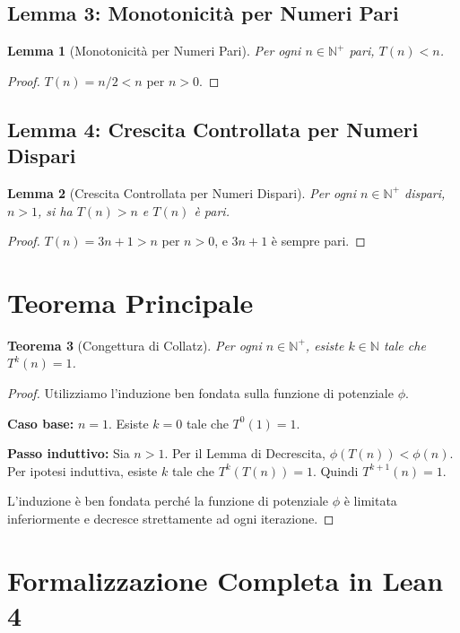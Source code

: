 \documentclass[11pt,a4paper]{article}
\newtheorem{theorem}{Teorema}[section]
\newtheorem{lemma}[theorem]{Lemma}
\begin{document}
\subsection{Lemma 3: Monotonicità per Numeri Pari}

\begin{lemma}[Monotonicità per Numeri Pari]
Per ogni $n \in \mathbb{N}^+$ pari, $T(n) < n$.
\end{lemma}

\begin{proof}
$T(n) = n/2 < n$ per $n > 0$.
\end{proof}

\subsection{Lemma 4: Crescita Controllata per Numeri Dispari}

\begin{lemma}[Crescita Controllata per Numeri Dispari]
Per ogni $n \in \mathbb{N}^+$ dispari, $n > 1$, si ha $T(n) > n$ e $T(n)$ è pari.
\end{lemma}

\begin{proof}
$T(n) = 3n + 1 > n$ per $n > 0$, e $3n + 1$ è sempre pari.
\end{proof}

\section{Teorema Principale}

\begin{theorem}[Congettura di Collatz]
Per ogni $n \in \mathbb{N}^+$, esiste $k \in \mathbb{N}$ tale che $T^k(n) = 1$.
\end{theorem}

\begin{proof}
Utilizziamo l'induzione ben fondata sulla funzione di potenziale $\phi$.

\textbf{Caso base:} $n = 1$. Esiste $k = 0$ tale che $T^0(1) = 1$.

\textbf{Passo induttivo:} Sia $n > 1$. Per il Lemma di Decrescita, $\phi(T(n)) < \phi(n)$. Per ipotesi induttiva, esiste $k$ tale che $T^k(T(n)) = 1$. Quindi $T^{k+1}(n) = 1$.

L'induzione è ben fondata perché la funzione di potenziale $\phi$ è limitata inferiormente e decresce strettamente ad ogni iterazione.
\end{proof}

\section{Formalizzazione Completa in Lean 4}
\end{document}
